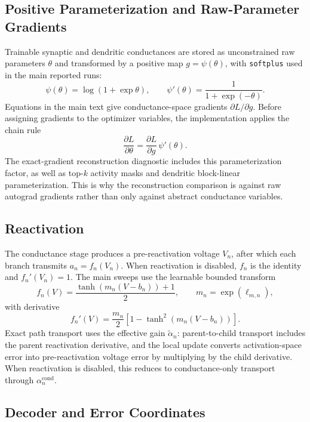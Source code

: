     \subsection{Positive Parameterization and Raw-Parameter Gradients}
    
    Trainable synaptic and dendritic conductances are stored as unconstrained raw parameters $\theta$ and transformed by a positive map $g=\psi(\theta)$, with \texttt{softplus} used in the main reported runs:
    \[
    \psi(\theta)=\log(1+\exp\theta),
    \qquad
    \psi'(\theta)=\frac{1}{1+\exp(-\theta)}.
    \]
    Equations in the main text give conductance-space gradients $\partial L/\partial g$. Before assigning gradients to the optimizer variables, the implementation applies the chain rule
    \[
    \frac{\partial L}{\partial \theta}
    =\frac{\partial L}{\partial g}\,\psi'(\theta).
    \]
    The exact-gradient reconstruction diagnostic includes this parameterization factor, as well as top-$k$ activity masks and dendritic block-linear parameterization. This is why the reconstruction comparison is against raw autograd gradients rather than only against abstract conductance variables.
    
    \subsection{Reactivation}
    
    The conductance stage produces a pre-reactivation voltage $V_n$, after which each branch transmits $a_n=f_n(V_n)$. When reactivation is disabled, $f_n$ is the identity and $f_n'(V_n)=1$. The main sweeps use the learnable bounded transform
    \[
    f_n(V)=\frac{\tanh(m_n(V-b_n))+1}{2},
    \qquad
    m_n=\exp(\ell_{m,n}),
    \]
    with derivative
    \[
    f_n'(V)=\frac{m_n}{2}\left[1-\tanh^2(m_n(V-b_n))\right].
    \]
    Exact path transport uses the effective gain $\tilde{\alpha}_n$: parent-to-child transport includes the parent reactivation derivative, and the local update converts activation-space error into pre-reactivation voltage error by multiplying by the child derivative. When reactivation is disabled, this reduces to conductance-only transport through $\alpha_n^{\mathrm{cond}}$.
    
    \subsection{Decoder and Error Coordinates}
    
